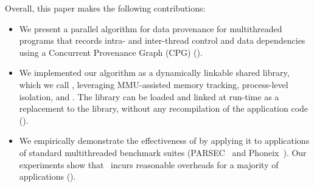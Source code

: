 Overall, this paper makes the following contributions:

\begin{itemize} 
\item We present a parallel algorithm for data provenance for multithreaded programs that records intra- and inter-thread control and data dependencies using a Concurrent Provenance Graph (CPG) ().

\item We implemented our algorithm as a dynamically linkable shared library, which we call \projecttitle, leveraging MMU-assisted memory tracking, process-level isolation, and \intelpt.  The \projecttitle library can be loaded and linked at run-time as a replacement to the \pthreads library, without any recompilation  of the application code ().

\item We  empirically demonstrate  the effectiveness of \projecttitle by applying it to applications of standard multithreaded benchmark suites (PARSEC~\cite{parsec} and Phoneix~\cite{phoenix}). Our experiments show that \projecttitle~incurs reasonable overheads for a majority of applications (). 

\end{itemize}
